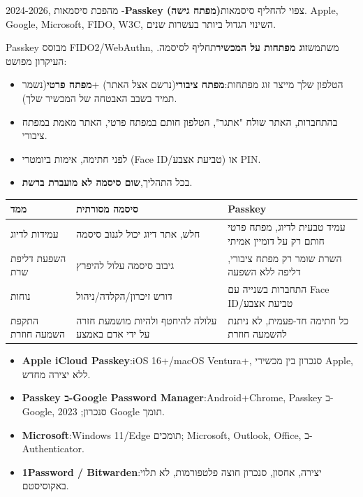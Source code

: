 
2024-2026, מהפכת סיסמאות -\textbf{Passkey (מפתח גישה)}צפוי להחליף סיסמאות. Apple, Google, Microsoft, FIDO, W3C, השינוי הגדול ביותר בעשרות שנים.


Passkey מבוסס FIDO2/WebAuthn, משתמש\textbf{זוג מפתחות על המכשיר}תחליף לסיסמה. העיקרון מפושט:

\begin{itemize}
  \item הטלפון שלך מייצר זוג מפתחות:\textbf{מפתח ציבורי}(נרשם אצל האתר) +\textbf{מפתח פרטי}(נשמר תמיד בשבב האבטחה של המכשיר שלך).
  \item בהתחברות, האתר שולח "אתגר", הטלפון חותם במפתח פרטי, האתר מאמת במפתח ציבורי.
  \item לפני חתימה, אימות ביומטרי (Face ID/טביעת אצבע) או PIN.
  \item בכל התהליך,\textbf{שום סיסמה לא מועברת ברשת}.
\end{itemize}


\begin{center}
\begin{tabularx}{\linewidth}{|X|X|X|}
\hline
\textbf{ממד} & \textbf{סיסמה מסורתית} & \textbf{Passkey} \tabularnewline
\hline
עמידות לדיוג & חלש, אתר דיוג יכול לגנוב סיסמה & עמיד טבעית לדיוג, מפתח פרטי חותם רק על דומיין אמיתי \tabularnewline
השפעת דליפת שרת & גיבוב סיסמה עלול להיפרץ & השרת שומר רק מפתח ציבורי, דליפה ללא השפעה \tabularnewline
נוחות & דורש זיכרון/הקלדה/ניהול & התחברות בשנייה עם Face ID/טביעת אצבע \tabularnewline
התקפת השמעה חוזרת & עלולה להיחטף ולהיות מושמעת חזרה על ידי אדם באמצע & כל חתימה חד-פעמית, לא ניתנת להשמעה חוזרת \tabularnewline
\hline
\end{tabularx}
\end{center}


\begin{itemize}
  \item \textbf{Apple iCloud Passkey}:iOS 16+/macOS Ventura+, סנכרון בין מכשירי Apple, ללא יצירה מחדש.
  \item \textbf{Passkey ב-Google Password Manager}:Android+Chrome, Passkey ב-Google, סנכרון; 2023 Google תומך.
  \item \textbf{Microsoft}:Windows 11/Edge תומכים; Microsoft, Outlook, Office, ב-Authenticator.
  \item \textbf{1Password / Bitwarden}:יצירה, אחסון, סנכרון חוצה פלטפורמות, לא תלוי באקוסיסטם.
\end{itemize}

